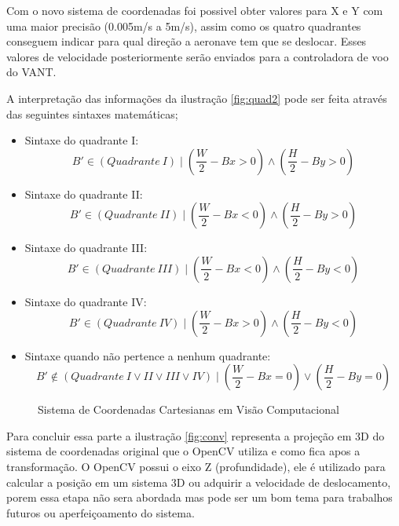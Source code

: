 Com o novo sistema de coordenadas foi possivel obter valores para X e Y com uma maior precisão (0.005m/s a 5m/s), assim como os quatro quadrantes conseguem indicar para qual direção a aeronave tem que se deslocar. Esses valores de velocidade posteriormente serão enviados para a controladora de voo do VANT. 

A interpretação das informações da ilustração \ref{fig:quad2} pode ser feita através das seguintes sintaxes matemáticas; 

\begin{itemize}
	\item Sintaxe do quadrante I:\begin{equation}\label{q1} B'\in (Quadrante\ I) \mid \left(\frac{W}{2} -Bx >0\right) \land \left(\frac{H}{2} -By >0\right)\end{equation} 
	\item Sintaxe do quadrante II:\begin{equation}\label{q2} B'\in (Quadrante\ II) \mid \left(\frac{W}{2} -Bx <0\right) \land \left(\frac{H}{2} -By >0\right)\end{equation} 
	\item Sintaxe do quadrante III:\begin{equation}\label{q3} B'\in (Quadrante\ III) \mid \left(\frac{W}{2} -Bx <0\right) \land \left(\frac{H}{2} -By <0\right)\end{equation} 
	\item Sintaxe do quadrante IV:\begin{equation}\label{q4} B'\in (Quadrante\ IV) \mid \left(\frac{W}{2} -Bx >0\right) \land \left(\frac{H}{2} -By <0\right)\end{equation} 
	\item Sintaxe quando não pertence a nenhum quadrante:\begin{equation}\label{nq} B'\notin ( Quadrante\ I\lor II\lor III\lor IV) \mid \left(\frac{W}{2} -Bx=0\right) \lor \left(\frac{H}{2} -By=0\right)\end{equation}
\end{itemize} 

\begin{figure}[H]
	\centering
	\caption{Sistema de Coordenadas Cartesianas em Visão Computacional}
	
	\label{fig:teste}
\end{figure}

Para concluir essa parte a ilustração \ref{fig:conv} representa a projeção em 3D do sistema de coordenadas original que o OpenCV utiliza e como fica apos a transformação. O OpenCV possui o eixo Z (profundidade), ele é utilizado para calcular a posição em um sistema 3D ou adquirir a velocidade de deslocamento, porem essa etapa não sera abordada mas pode ser um bom tema para trabalhos futuros ou aperfeiçoamento do sistema.

